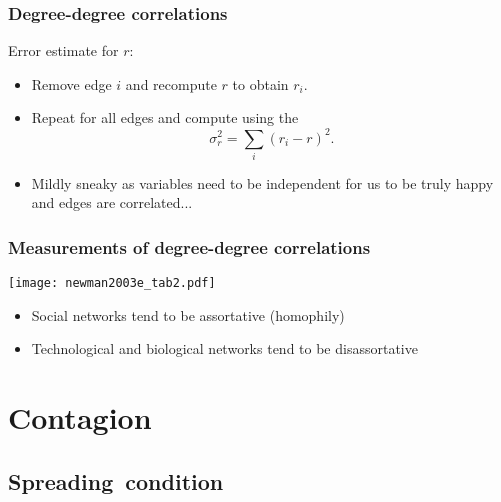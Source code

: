 \begin{frame}
  \frametitle{Degree-degree correlations}
  
  \begin{block}{Error estimate for $r$:}
    \begin{itemize}
    \item<1->
      Remove edge $i$ and recompute $r$ 
      to obtain $r_i$.
    \item<2->
      Repeat for all edges and compute
      using the 
      \cite{efron1981a}
      $$
      \sigma_r^2 
      =
      \sum_{i} (r_i - r)^2.
      $$
    \item<3-> Mildly sneaky as variables need to be
      independent for us to be truly happy and edges
      are correlated...
    \end{itemize}
  \end{block}

\end{frame}


\begin{frame}
  \frametitle{Measurements of degree-degree correlations}
  
  \texttt{[image: newman2003e\_tab2.pdf]}

  \begin{itemize}
  \item Social networks tend to be assortative (homophily)
  \item Technological and biological networks tend to be disassortative
  \end{itemize}

\end{frame}

\section{Contagion}

\subsection{Spreading\ condition}

